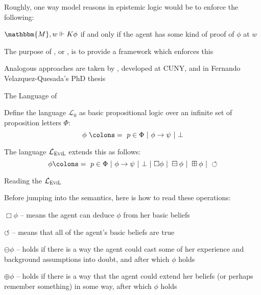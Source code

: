 \begin{itemizedot}
  \item Roughly, one way model reasons in epistemic logic would be to enforce
  the following:
  
  \begin{center}
    $\mathbbm{M}, w \Vdash K \phi$ if and only if the agent has some kind of
    proof of $\phi$ at $w$
  \end{center}
  
  \item The purpose of , or , is
  to provide a framework which enforces this
  
  \item Analogous approaches are taken by ,
  developed at CUNY, and in Fernando Velazquez-Quesada's PhD thesis
\end{itemizedot}
The Language of 
\begin{itemizedot}
  \item Define the language $\mathcal{L}_0$ as basic propositional logic over
  an infinite set of proposition letters $\Phi$:
  \[ \phi \text{ } \colons = \text{ } p \in \Phi \text{ } | \text{ } \phi
     \rightarrow \psi \text{ } | \text{ } \bot \]
  \item The language $\mathcal{L}_{\text{\textsc{EviL}}}$ extends this as
  follows:
  \[ \phi \colons = \text{ } p \in \Phi \text{ } | \text{ } \phi \rightarrow
     \psi \text{ } | \text{ } \bot \text{ } | \text{ } \Box  \phi \text{ } |
     \text{ } \boxminus \phi \text{ } | \text{ } \boxplus \phi \text{ } |
     \text{ } \circlearrowleft \]
\end{itemizedot}
Reading the $\mathcal{L}_{\text{\textsc{EviL}}}$
\begin{itemizedot}
  \item Before jumping into the semantics, here is how to read these
  operations:
  \begin{itemizeminus}
    \item[$\Box  \phi$ -- ] means the agent can deduce $\phi$ from her basic beliefs
    
    \item[$\circlearrowleft$ -- ] means that all of the agent's basic beliefs are
    true
    
    \item[$\ominus \phi$ -- ] holds if there is a way the agent could cast some of
    her experience and background assumptions into doubt, and after which
    $\phi$ holds
    
    \item[$\oplus \phi$ -- ] holds if there is a way that the agent could extend her
    beliefs (or perhaps remember something) in some way, after which $\phi$
    holds
  \end{itemizeminus}
\end{itemizedot}
